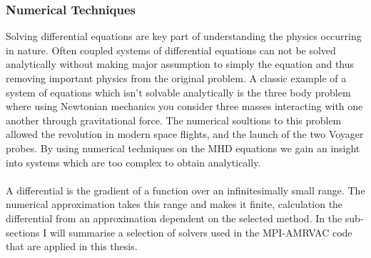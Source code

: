\documentclass[12pt,a4paper,twoside]{article}
\begin{document}
\subsubsection{Numerical Techniques}
Solving differential equations are key part of understanding the physics occurring in nature. Often coupled systems of differential equations can not be solved analytically without making major assumption to simply the equation and thus removing important physics from the original problem. A classic example of a system of equations which isn't solvable analytically is the three body problem where using Newtonian mechanics you consider three masses interacting with one another through gravitational force. The numerical soultions to this problem allowed the revolution in modern space flights, and the launch of the two Voyager probes. By using numerical techniques on the MHD equations we gain an insight into systems which are too complex to obtain analytically.  \\ \\A differential is the gradient of a function over an infinitesimally small range. The numerical approximation takes this range and makes it finite, calculation the differential from an approximation dependent on the selected method. In the sub-sections I will summarise a selection of solvers used in the MPI-AMRVAC code that are applied in this thesis.
\end{document}
